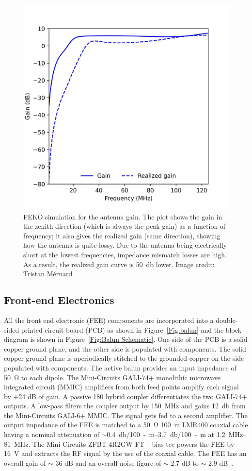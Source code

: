 \begin{figure}
	\centering
	\includegraphics[width=0.7\linewidth]{Figures/LWA_mesh_gain}
	\caption{FEKO simulation for the antenna gain. The plot shows the gain in the zenith direction (which is always the peak gain) as a function of frequency; it also gives the realized gain (same direction), showing how the antenna is quite lossy. Due to the antenna being electrically short at the lowest frequencies, impedance mismatch losses are high. As a result, the realized gain curve is \SI{50}{\decibel} lower. Image credit: Tristan M\'ernard}
	\label{Fig:LWA_mesh_gain}
\end{figure}

\subsection{Front-end Electronics}\label{s:fee}

All the front end electronic (FEE) components are incorporated into a double-sided printed circuit board (PCB) as shown in Figure~\ref{Fig:balun} and the block diagram is shown in Figure~\ref{Fig:Balun Schematic}. One side of the PCB is a solid copper ground plane, and the other side is populated with components. The solid copper ground plane is aperiodically stitched to the grounded copper on the side populated with components. The active balun provides an input impedance of \SI{50}{\ohm} to each dipole. The Mini-Circuits GALI-74+ monolithic microwave integrated circuit (MMIC) amplifiers from both feed points amplify each signal by +24 dB of gain. A passive {180\degree} hybrid coupler differentiates the two GALI-74+ outputs. A low-pass filters the coupler output by \SI{150}{\mega\hertz} and gains \SI{12}{\decibel} from the Mini-Circuits GALI-6+ MMIC. The signal gets fed to a second amplifier. The output impedance of the FEE is matched to a \SI{50}{\ohm} \SI{100}{\meter} LMR400 coaxial cable having a nominal attenuation of $\sim$\SIrange{0.4}{3.7}{\decibel/100-m} at \SIrange{1.2}{81}{\mega\hertz}. The Mini-Circuits ZFBT-4R2GW-FT+ bias tee powers the FEE by \SI{16}{\volt} and extracts the RF signal by the use of the coaxial cable. The FEE has an overall gain of $\sim$ 36 dB and an overall noise figure of $\sim$ 2.7 dB to $\sim$ 2.9 dB~\citep{Memo35, 2012PASP..124.1090H}.

